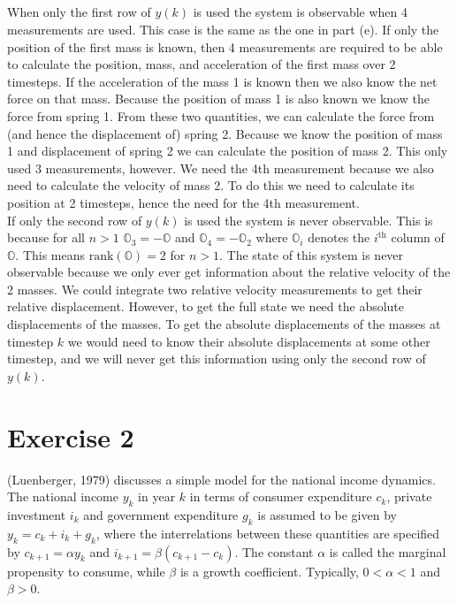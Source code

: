 \documentclass[11pt]{article}
\begin{document}
\subparagraph*{}
When only the first row of $y(k)$ is used the system is observable when 4 measurements are used. This case is the same as the one in part (e). If only the position of the first mass is known, then 4 measurements are required to be able to calculate the position, mass, and acceleration of the first mass over 2 timesteps. If the acceleration of the mass 1 is known then we also know the net force on that mass. Because the position of mass 1 is also known we know the force from spring 1. From these two quantities, we can calculate the force from (and hence the displacement of) spring 2. Because we know the position of mass 1 and displacement of spring 2 we can calculate the position of mass 2. This only used 3 measurements, however. We need the 4th measurement because we also need to calculate the velocity of mass 2. To do this we need to calculate its position at 2 timesteps, hence the need for the 4th measurement. \\
If only the second row of $y(k)$ is used the system is never observable. This is because for all $n>1$ $\mathbb{O}_3=-\mathbb{O}$ and $\mathbb{O}_4=-\mathbb{O}_2$ where $\mathbb{O}_i$ denotes the $i^\text{th}$ column of $\mathbb{O}$. This means $\text{rank}(\mathbb{O})=2$ for $n>1$. The state of this system is never observable because we only ever get information about the relative velocity of the 2 masses. We could integrate two relative velocity measurements to get their relative displacement. However, to get the full state we need the absolute displacements of the masses. To get the absolute displacements of the masses at timestep $k$ we would need to know their absolute displacements at some other timestep, and we will never get this information using only the second row of $y(k)$.

\section*{Exercise 2}
(Luenberger, 1979) discusses a simple model for the national income dynamics. The national income $y_k$ in year $k$ in terms of consumer expenditure $c_k$, private investment $i_k$ and government expenditure $g_k$ is assumed to be given by $y_k=c_k+i_k+g_k$, where the interrelations between these quantities are specified by $c_{k+1}=\alpha y_k$ and $i_{k+1}=\beta(c_{k+1}-c_k)$. The constant $\alpha$ is called the marginal propensity to consume, while $\beta$ is a growth coefficient. Typically, $0<\alpha<1$ and $\beta > 0$.
\end{document}
